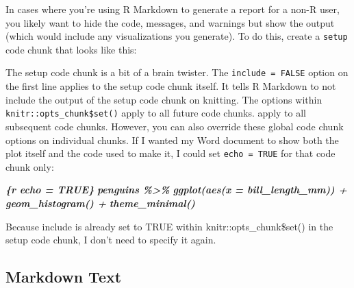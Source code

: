 \documentclass[
]{book}
\newenvironment{Shaded}{\begin{snugshade}}{\end{snugshade}}
\newcommand{\InformationTok}[1]{\textcolor[rgb]{0.56,0.35,0.01}{\textbf{\textit{#1}}}}
\begin{document}
In cases where you're using R Markdown to generate a report for a non-R user, you likely want to hide the code, messages, and warnings but show the output (which would include any visualizations you generate). To do this, create a \texttt{setup} code chunk that looks like this:

\begin{Shaded}
\end{Shaded}

The setup code chunk is a bit of a brain twister. The \texttt{include\ =\ FALSE} option on the first line applies to the setup code chunk itself. It tells R Markdown to not include the output of the setup code chunk on knitting. The options within \texttt{knitr::opts\_chunk\$set()} apply to all future code chunks. apply to all subsequent code chunks. However, you can also override these global code chunk options on individual chunks. If I wanted my Word document to show both the plot itself and the code used to make it, I could set \texttt{echo\ =\ TRUE} for that code chunk only:

\begin{Shaded}
\begin{Highlighting}[]
\InformationTok{\textasciigrave{}\textasciigrave{}\textasciigrave{}\{r echo = TRUE\}}
\InformationTok{penguins \%\textgreater{}\% }
\InformationTok{  ggplot(aes(x = bill\_length\_mm)) +}
\InformationTok{  geom\_histogram() +}
\InformationTok{  theme\_minimal()}
\InformationTok{\textasciigrave{}\textasciigrave{}\textasciigrave{}}
\end{Highlighting}
\end{Shaded}

Because include is already set to TRUE within knitr::opts\_chunk\$set() in the setup code chunk, I don't need to specify it again.

\hypertarget{markdown-text}{%
\subsection*{Markdown Text}\label{markdown-text}}
\end{document}
